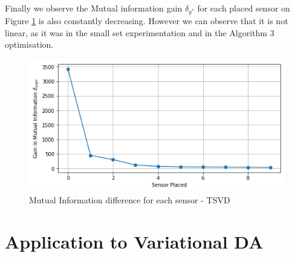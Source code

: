 Finally we observe the Mutual information gain $\delta_{y^*}$ for each placed sensor on Figure \ref{fig:full_set_tsvd:MIGAIN} is also constantly decreasing. However we can observe that it is not linear, as it was in the small set experimentation and in the Algorithm 3 optimisation. 
\\

\begin{figure}[h!]
\centering
\includegraphics[width=0.6\linewidth]{figures/MainOptimTSVD/MIGain}
\caption{Mutual Information difference for each sensor - TSVD}
\label{fig:full_set_tsvd:MIGAIN}
\end{figure}




%
%
%
%
%




\section{Application to Variational DA}


